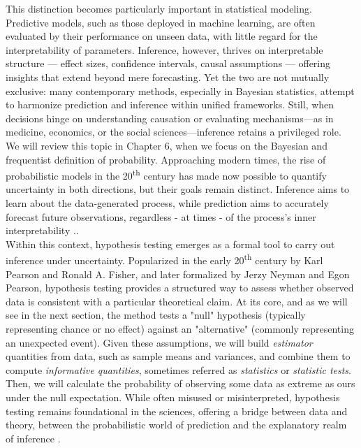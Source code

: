 \documentclass{book}
\begin{document}
This distinction becomes particularly important in statistical modeling. Predictive models, such as those deployed in machine learning, are often evaluated by their performance on unseen data, with little regard for the interpretability of parameters. Inference, however, thrives on interpretable structure — effect sizes, confidence intervals, causal assumptions — offering insights that extend beyond mere forecasting. Yet the two are not mutually exclusive: many contemporary methods, especially in Bayesian statistics, attempt to harmonize prediction and inference within unified frameworks. Still, when decisions hinge on understanding causation or evaluating mechanisms—as in medicine, economics, or the social sciences—inference retains a privileged role. We will review this topic in Chapter 6, when we focus on the Bayesian and frequentist definition of probability. Approaching modern times, the rise of probabilistic models in the 20\textsuperscript{th} century has made now possible to quantify uncertainty in both directions, but their goals remain distinct. Inference aims to learn about the data-generated process, while prediction aims to accurately forecast future observations, regardless - at times - of the process's inner interpretability \cite{fisher1925}.\cite{pearson1900}.\\

Within this context, hypothesis testing emerges as a formal tool to carry out inference under uncertainty. Popularized in the early 20\textsuperscript{th} century by Karl Pearson and Ronald A. Fisher, and later formalized by Jerzy Neyman and Egon Pearson, hypothesis testing provides a structured way to assess whether observed data is consistent with a particular theoretical claim. At its core, and as we will see in the next section, the method tests a "null" hypothesis (typically representing chance or no effect) against an "alternative" (commonly representing an unexpected event). Given these assumptions, we will build \textit{estimator} quantities from data, such as sample means and variances, and combine them to compute \textit{informative quantities}, sometimes referred as \textit{statistics} or \textit{statistic tests}. Then, we will calculate the probability of observing some data as extreme as ours under the null expectation. While often misused or misinterpreted, hypothesis testing remains foundational in the sciences, offering a bridge between data and theory, between the probabilistic world of prediction and the explanatory realm of inference \cite{welch1947}.\\
\end{document}
